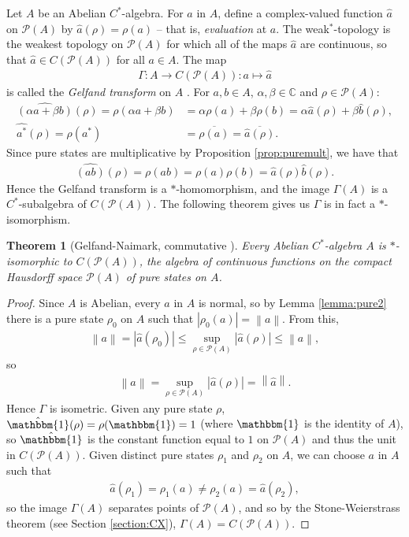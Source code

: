 \documentclass[11pt,a4paper]{report}
\theoremstyle{plain}
\newtheorem{thm}{Theorem}
\theoremstyle{definition}
\newcommand{\1}{\mathbbm{1}}
\newcommand{\C}{\mathbb{C}}
\renewcommand{\P}[1]{\mathscr{P}(#1)}
\begin{document}
Let $A$ be an Abelian $C^\ast$-algebra. For $a$ in $A$, define a complex-valued function $\hat{a}$ on
$\P{A}$ by $\hat{a}(\rho)= \rho(a)$ -- that is, \emph{evaluation} at $a$. The weak$^\ast$-topology is 
the weakest topology on $\P{A}$ for which all of the maps $\hat{a}$ are continuous, so that $\hat{a} \in 
C(\P{A})$ for all $a\in A$. The map
\begin{align*}
	\Gamma:A \to C(\P{A}) : a\mapsto \hat{a}
\end{align*}
is called the \emph{Gelfand transform} on $A$ \cite{davidson96}.
For $a,b \in A$, $\alpha,\beta\in\C$ and $\rho\in\P{A}$:
\begin{align*}
	\widehat{(\alpha a+\beta b)}(\rho) = \rho(\alpha a+\beta b) 
	&=	\alpha\rho(a) +\beta\rho(b) = \alpha\hat{a}(\rho)+ \beta\hat{b}(\rho), 	\\
	\widehat{a^\ast}(\rho) = \rho(a^\ast) &= \overline{\rho(a)} = \overline{\hat{a}(\rho)}.
\end{align*}
Since pure states are multiplicative by Proposition \ref{prop:puremult}, we have that 
\begin{align*}
	\widehat{(ab)} (\rho)= \rho(ab) = \rho(a)\rho(b) = \hat{a}(\rho)\hat{b}(\rho).
\end{align*}
Hence the Gelfand transform is a $\ast$-homomorphism, and the image $\Gamma(A)$ is a $C^\ast$-subalgebra 
of $C(\P A)$. The following theorem gives us $\Gamma$ is in fact a $\ast$-isomorphism.

\begin{thm}[{Gelfand-Naimark, commutative \cite[4.4.3]{kadison83}}] \label{thm:gnc}
	Every Abelian $C^\ast$-algebra $A$ is $\ast$-isomorphic to $C(\P A)$, the algebra of continuous
	functions on the compact Hausdorff space $\P A$ of pure states on $A$.
\end{thm}
\begin{proof}
	Since $A$ is Abelian, every $a$ in $A$ is normal, so by Lemma \ref{lemma:pure2} there is a pure 
	state $\rho_0$ on $A$ such that $|\rho_0(a)|=\left\|a\right\|$. From this, 
	\begin{align*}
		\left\|a\right\|=|\hat a(\rho_0)|\leq \sup_{\rho\in\P A}|\hat a(\rho)| \leq \left\|a\right\|,
	\end{align*}
	so 
	\begin{align*}
		\left\|a\right\|=\sup_{\rho\in\P A} |\hat a (\rho)| = \left\|\hat a\right\|.
	\end{align*}
	Hence $\Gamma$ is isometric.
	Given any pure state $\rho$, $\hat \1(\rho) = \rho(\1) = 1$ (where $\1$ is the identity of $A$), so
	$\hat\1$ is the constant function equal to $1$ on $\P A$ and thus the unit in $C(\P A)$.
	Given distinct pure states $\rho_1$ and $\rho_2$ on $A$, we can choose $a$ in $A$ such that 
	\begin{align*}
		\hat a(\rho_1) = \rho_1(a) \not= \rho_2(a) = \hat a(\rho_2),
	\end{align*}
	so the image $\Gamma(A)$ separates points of $\P A$, and so by the Stone-Weierstrass theorem (see 
	Section \ref{section:CX}), $\Gamma(A)=C(\P A)$.
\end{proof}
\end{document}
